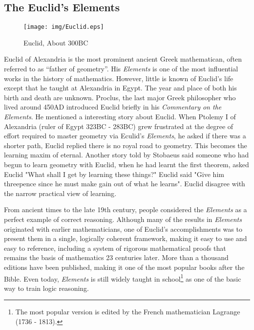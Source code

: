 \documentclass{article}
\begin{document}
\subsection{The Euclid's Elements}

\begin{wrapfigure}{R}{0.4\textwidth}
 \centering
 \texttt{[image: img/Euclid.eps]}
 \captionsetup{labelformat=empty}
 \caption{Euclid, About 300BC}
 \label{fig:Euclid}
\end{wrapfigure}

Euclid of Alexandria is the most prominent ancient Greek mathematican, often referred to as ``father of geometry''. His {\em Elements} is one of the most influential works in the history of mathematics. However, little is known of Euclid's life except that he taught at Alexandria in Egypt. The year and place of both his birth and death are unknown. Proclus, the last major Greek philosopher who lived around 450AD introduced Euclid briefly in his {\em Commentary on the Elements}. He mentioned a interesting story about Euclid. When Ptolemy I of Alexandria (ruler of Egypt 323BC - 283BC) grew frustrated at the degree of effort required to master geometry via Eculid's {\em Elements}, he asked if there was a shorter path, Euclid replied there is no royal road to geometry. This becomes the learning maxim of eternal. Another story told by Stobaeus said someone who had begun to learn geometry with Euclid, when he had learnt the first theorem, asked Euclid "What shall I get by learning these things?" Euclid said "Give him threepence since he must make gain out of what he learns". Euclid disagree with the narrow practical view of learning\cite{Elements}.

From ancient times to the late 19th century, people considered the {\em Elements} as a perfect example of correct reasoning. Although many of the results in {\em Elements} originated with earlier mathematicians, one of Euclid's accomplishments was to present them in a single, logically coherent framework, making it easy to use and easy to reference, including a system of rigorous mathematical proofs that remains the basis of mathematics 23 centuries later. More than a thousand editions have been published, making it one of the most popular books after the Bible. Even today, {\em Elements} is still widely taught in school\footnote{The most popular version is edited by the French mathematician Lagrange (1736 - 1813).} as one of the basic way to train logic reasoning\cite{HanXueTao16}.
\end{document}
